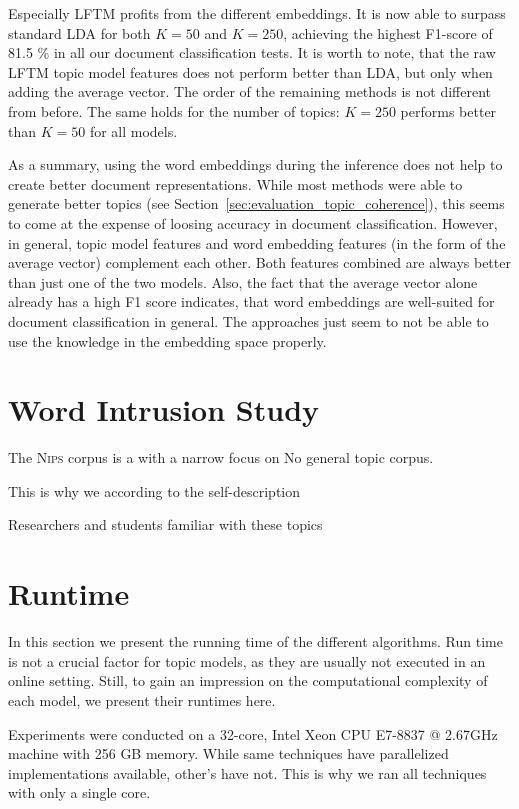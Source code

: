 \documentclass[
        a4paper,
        titlepage,
        twoside,
        parskip
        ]{scrbook}
\theoremstyle{break}
\begin{document}
Especially LFTM profits from the different embeddings.
It is now able to surpass standard LDA for both $K = 50$ and $K = 250$, achieving the highest F1-score of 81.5 \% in all our document classification tests.
It is worth to note, that the raw LFTM topic model features does not perform better than LDA, but only when adding the average vector.
The order of the remaining methods is not different from before.
The same holds for the number of topics: $K = 250$ performs better than $K = 50$ for all models.

As a summary, using the word embeddings during the inference does not help to create better document representations.
While most methods were able to generate better topics (see Section~\ref{sec:evaluation_topic_coherence}), this seems to come at the expense of loosing accuracy in document classification.
However, in general, topic model features and word embedding features (in the form of the average vector) complement each other.
Both features combined are always better than just one of the two models.
Also, the fact that the average vector alone already has a high F1 score indicates, that word embeddings are well-suited for document classification in general.
The approaches just seem to not be able to use the knowledge in the embedding space properly.

\section{Word Intrusion Study}

The \textsc{Nips} corpus is a with a narrow focus on 
No general topic corpus.

This is why we 
according to the self-description

Researchers and students familiar with these topics

\section{Runtime}

In this section we present the running time of the different algorithms.
Run time is not a crucial factor for topic models, as they are usually not executed in an online setting.
Still, to gain an impression on the computational complexity of each model, we present their runtimes here.

Experiments were conducted on a 32-core, Intel Xeon CPU E7-8837 @ 2.67GHz machine with 256 GB memory.
While same techniques have parallelized implementations available, other's have not.
This is why we ran all techniques with only a single core.
\end{document}
